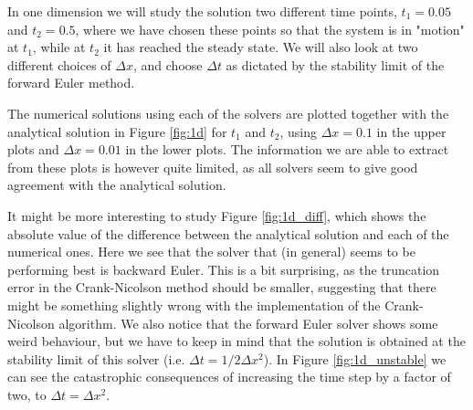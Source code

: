 \documentclass[12pt, a4paper]{article}
\begin{document}
In one dimension we will study the solution two different time points, $t_1=0.05$ and $t_2=0.5$, where we 
have chosen these points so that the system is in "motion" at $t_1$, while at $t_2$ it has reached 
the steady state. We will also look at two different choices of $\Delta x$, and choose $\Delta t$ as 
dictated by the stability limit of the forward Euler method. 

The numerical solutions using each of the solvers are plotted together with the analytical solution 
in Figure \ref{fig:1d} for $t_1$ and $t_2$, using $\Delta x = 0.1$ in the upper plots and 
$\Delta x = 0.01$ in the lower plots. The 
information we are able to extract from these plots is however quite limited, as all solvers seem to 
give good agreement with the analytical solution. 

It might be more interesting to study Figure 
\ref{fig:1d_diff}, which shows the absolute value of the difference between the analytical solution and 
each of the numerical ones. Here we see that the solver that (in general) seems to be performing best is 
backward Euler. This is a bit surprising, as the truncation error in the Crank-Nicolson method should be
smaller, suggesting that there might be something slightly wrong with the implementation of the 
Crank-Nicolson algorithm. We also notice that the forward Euler solver shows some weird behaviour, but 
we have to keep in mind that the solution is obtained at the stability limit of this solver 
(i.e. $\Delta t = 1/2 \Delta x^2$). In Figure \ref{fig:1d_unstable} we can see the catastrophic 
consequences of increasing the time step by a factor of two, to $\Delta t = \Delta x^2$.        
\end{document}
